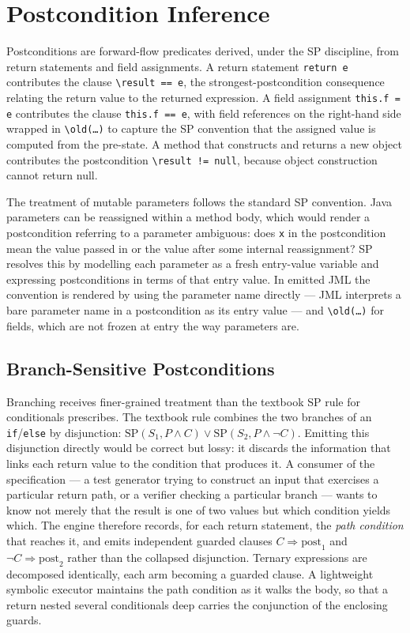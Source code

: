 \section{Postcondition Inference}
\label{sec:inf-post}

Postconditions are forward-flow predicates derived, under the SP discipline,
from return statements and field assignments. A return statement
\texttt{return e} contributes the clause \texttt{\textbackslash result == e},
the strongest-postcondition consequence relating the return value to the
returned expression. A field assignment \texttt{this.f = e} contributes the
clause \texttt{this.f == e}, with field references on the right-hand side
wrapped in \texttt{\textbackslash old(\dots)} to capture the SP convention that
the assigned value is computed from the pre-state. A method that constructs and
returns a new object contributes the postcondition
\texttt{\textbackslash result != null}, because object construction cannot
return null.

The treatment of mutable parameters follows the standard SP convention. Java
parameters can be reassigned within a method body, which would render a
postcondition referring to a parameter ambiguous: does \texttt{x} in the
postcondition mean the value passed in or the value after some internal
reassignment? SP resolves this by modelling each parameter as a fresh
entry-value variable and expressing postconditions in terms of that entry
value. In emitted JML the convention is rendered by using the parameter name
directly --- JML interprets a bare parameter name in a postcondition as its
entry value --- and \texttt{\textbackslash old(\dots)} for fields, which are
not frozen at entry the way parameters are.

\subsection{Branch-Sensitive Postconditions}

Branching receives finer-grained treatment than the textbook SP rule for
conditionals prescribes. The textbook rule combines the two branches of an
\texttt{if}/\texttt{else} by disjunction:
$\mathrm{SP}(S_1, P \wedge C) \vee \mathrm{SP}(S_2, P \wedge \neg C)$. Emitting
this disjunction directly would be correct but lossy: it discards the
information that links each return value to the condition that produces it. A
consumer of the specification --- a test generator trying to construct an input
that exercises a particular return path, or a verifier checking a particular
branch --- wants to know not merely that the result is one of two values but
which condition yields which. The engine therefore records, for each return
statement, the \emph{path condition} that reaches it, and emits independent
guarded clauses $C \Rightarrow \mathrm{post}_1$ and
$\neg C \Rightarrow \mathrm{post}_2$ rather than the collapsed disjunction.
Ternary expressions are decomposed identically, each arm becoming a guarded
clause. A lightweight symbolic executor maintains the path condition as it
walks the body, so that a return nested several conditionals deep carries the
conjunction of the enclosing guards.

